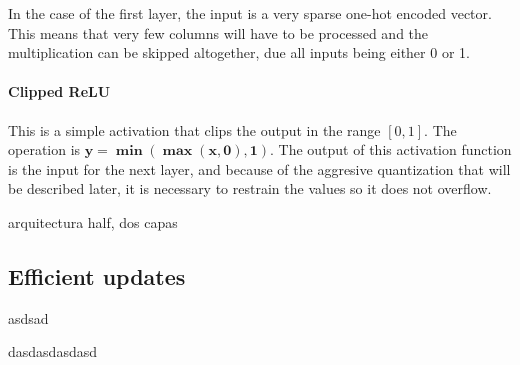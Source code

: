 In the case of the first layer, the input is a very sparse one-hot encoded vector. This means that very few columns will have to be processed and the multiplication can be skipped altogether, due all inputs being either 0 or 1.

\paragraph[short]{Clipped ReLU} This is a simple activation that clips the output in the range $[0, 1]$. The operation is $\bm{y=\min(\max(x,0),1)}$.
The output of this activation function is the input for the next layer, and because of the aggresive quantization that will be described later, it is necessary to restrain the values so it does not overflow.


arquitectura half, dos capas




\subsection{Efficient updates}

asdsad

dasdasdasdasd

